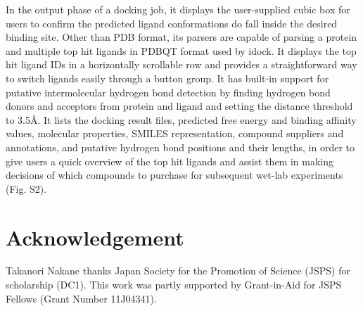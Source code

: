 \documentclass{bioinfo}
\begin{document}
\begin{methods}
In the output phase of a docking job, it displays the user-supplied cubic box for users to confirm the predicted ligand conformations do fall inside the desired binding site. Other than PDB format, its parsers are capable of parsing a protein and multiple top hit ligands in PDBQT format used by idock. It displays the top hit ligand IDs in a horizontally scrollable row and provides a straightforward way to switch ligands easily through a button group. It has built-in support for putative intermolecular hydrogen bond detection by finding hydrogen bond donors and acceptors from protein and ligand and setting the distance threshold to 3.5\AA. It lists the docking result files, predicted free energy and binding affinity values, molecular properties, SMILES representation, compound suppliers and annotations, and putative hydrogen bond positions and their lengths, in order to give users a quick overview of the top hit ligands and assist them in making decisions of which compounds to purchase for subsequent wet-lab experiments (Fig. S2).

\end{methods}

\section{Acknowledgement}

Takanori Nakane thanks Japan Society for the Promotion of Science (JSPS) for scholarship (DC1). This work was partly supported by Grant-in-Aid for JSPS Fellows (Grant Number 11J04341).


%
%
%
%
%
%


\end{document}
